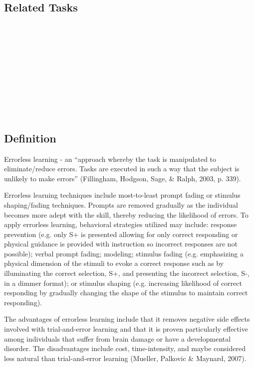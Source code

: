 \subsection{Related Tasks}
\fourdTen{}\\
\fourdEleven{}\\
\fourdTwelve{}\\
\fourdThirteen{}\\
\fourdFourteen{}\\
\fourFKFourtyThree{}\\
\fourFKFourtyFour{}\\
\fourFKFourtyFive{}\\
\fourFKFourtySix{}\\
%
\clearpage \section{\foureTwelve{}}
\subsection{Definition}
Errorless learning - an ``approach whereby the task is manipulated to eliminate/reduce errors. Tasks are executed in such a way that the subject is unlikely to make errors'' (Fillingham, Hodgson, Sage, \& Ralph, 2003, p. 339). 

Errorless learning techniques include most-to-least prompt fading or stimulus shaping/fading techniques. Prompts are removed gradually as the individual becomes more adept with the skill, thereby reducing the likelihood of errors.  To apply errorless learning, behavioral strategies utilized may include: response prevention (e.g. only S+ is presented allowing for only correct responding or physical guidance is provided with instruction so incorrect responses are not possible); verbal prompt fading; modeling; stimulus fading (e.g. emphasizing a physical dimension of the stimuli to evoke a correct response such as by illuminating the correct selection, S+, and presenting the incorrect selection, S-, in a dimmer format); or stimulus shaping (e.g. increasing likelihood of correct responding by gradually changing the shape of the stimulus to maintain correct responding). 

The advantages of errorless learning include that it removes negative side effects involved with trial-and-error learning and that it is proven particularly effective among individuals that suffer from brain damage or have a developmental disorder. The disadvantages include cost, time-intensity, and maybe considered less natural than trial-and-error learning (Mueller, Palkovic \& Maynard, 2007).

